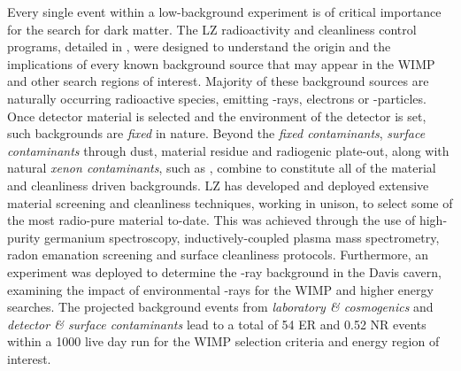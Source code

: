 Every single event within a low-background experiment is of critical importance for the search for dark matter. The LZ radioactivity and cleanliness control programs, detailed in \cite{lz_screening}, were designed to understand the origin and the implications of every known background source that may appear in the WIMP and other search regions of interest. Majority of these background sources are naturally occurring radioactive species, emitting \gamma{}-rays, electrons or \alpha{}-particles. Once detector material is selected and the environment of the detector is set, such backgrounds are \textit{fixed} in nature. Beyond the \textit{fixed contaminants}, \textit{surface contaminants} through dust, material residue and radiogenic plate-out, along with natural \textit{xenon contaminants}, such as \KrEF, combine to constitute all of the material and cleanliness driven backgrounds. LZ has developed and deployed extensive material screening and cleanliness techniques, working in unison, to select some of the most radio-pure material to-date. This was achieved through the use of high-purity germanium spectroscopy, inductively-coupled plasma mass spectrometry, radon emanation screening and surface cleanliness protocols. Furthermore, an experiment was deployed to determine the \gamma{}-ray background in the Davis cavern, examining the impact of environmental \gamma{}-rays for the WIMP and higher energy searches. The projected background events from \textit{laboratory \& cosmogenics} and \textit{detector \& surface contaminants} lead to a total of 54 ER and 0.52 NR events within a 1000 live day run for the WIMP selection criteria and energy region of interest.

